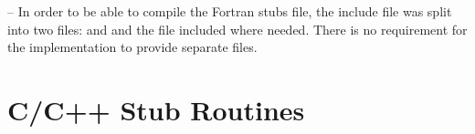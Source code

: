 \fortranspecificstart

\noteheader -- In order to be able to compile the Fortran stubs file, the include file 
 was split into two files:  and  and the 
 file included where needed. There is no requirement for the 
implementation to provide separate files.

\fortranspecificend







\filbreak
\section{C/C++ Stub Routines}
\label{sec:C/C++ Stub Routines}
